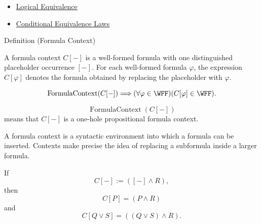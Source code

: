 \begin{dependencies}
\begin{itemize}
  \item \hyperref[def:logical-equivalence-propositional-logic]{Logical Equivalence}
  \item \hyperref[thm:conditional-equivalence-laws-propositional-logic]{Conditional Equivalence Laws}
\end{itemize}
\end{dependencies}
\begin{definitionbox}{Definition (Formula Context)}
\begin{definition}
\label{def:formula-context-propositional-logic}
A formula context \(C[-]\) is a well-formed formula with one distinguished placeholder occurrence \([-]\). For each well-formed formula \(\varphi\), the expression \(C[\varphi]\) denotes the formula obtained by replacing the placeholder with \(\varphi\).
\end{definition}
\end{definitionbox}

\begin{remark*}
\[
\operatorname{FormulaContext}(C[-])
\Longrightarrow
(\forall\varphi\in\WFF)(C[\varphi]\in\WFF).
\]
\end{remark*}

\begin{remark*}
\[
\operatorname{FormulaContext}(C[-])
\]
means that \(C[-]\) is a one-hole propositional formula context.
\end{remark*}

\begin{remark*}[Interpretation]
A formula context is a syntactic environment into which a formula can be inserted. Contexts make precise the idea of replacing a subformula inside a larger formula.
\end{remark*}

\begin{remark*}[Examples]
If
\[
C[-] := ([-]\land R),
\]
then
\[
C[P]=(P\land R)
\]
and
\[
C[Q\lor S]=((Q\lor S)\land R).
\]
\end{remark*}

